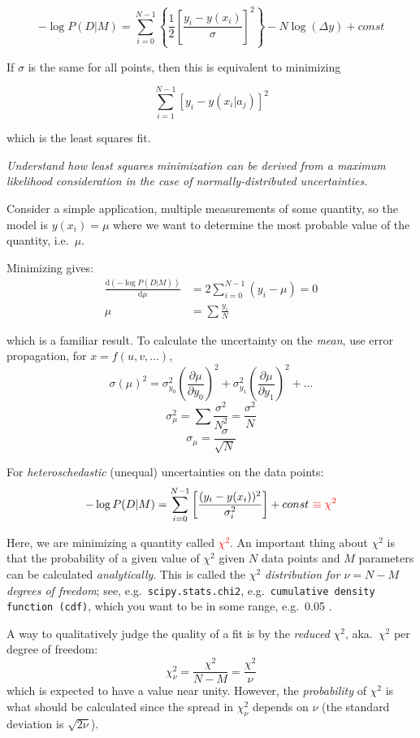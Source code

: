 \documentclass[12pt]{article}
\begin{document}
$$ -\log P(D|M) = \sum^{N-1}_{i=0}\left\{\frac{1}{2}\left[
\frac{y_i-y(x_i)}{\sigma}\right]^2\right\}
        -N\log(\Delta y) + const $$

If $\sigma$ is the same for all points, then this is equivalent to minimizing

    $$ \sum^{N-1}_{i=1}\left[y_i-y(x_i|a_j)\right]^2 $$

which is the least squares fit.

\colorbox{hl}{\parbox{0.9\textwidth}
{\emph{Understand how least squares minimization can be derived from a maximum
        likelihood consideration in the case of normally-distributed
        uncertainties.}}}

Consider a simple application, multiple measurements of some quantity, so the
model is $y(x_i) = \mu$ where we want to determine the most probable value of
the quantity, i.e.\ $\mu$.

Minimizing gives:
\begin{align*}
    \frac{\mathrm{d}(-\log P(D|M))}{\mathrm{d}\mu}
    &= 2\sum^{N-1}_{i=0}(y_i-\mu) = 0 \\
    \mu &= \sum \frac{y_i}{N}
\end{align*}

which is a familiar result. To calculate the uncertainty on the
\emph{mean}, use error propagation, for $x=f(u,v,\ldots)$,
    $$ \sigma(\mu)^2 = \sigma_{y_0}^2
    \left( \frac{\partial{\mu}}{\partial{y}_0}\right)^2
    + \sigma_{y_1}^2
    \left( \frac{\partial{\mu}}{\partial{y}_1}\right)^2
    + \ldots $$
    $$ \sigma_{\mu}^{2} = \sum\frac{\sigma^{2}}{N^{2}} = \frac{\sigma^{2}}{N}$$
    $$ \sigma_{\mu} = \frac{\sigma}{\sqrt{N}} $$

For \emph{heteroschedastic} (unequal) uncertainties on the data points:
$$ -\log P(D|M) = \sum_{i=0}^{N-1}\left[
\frac{(y_i-y(x_i))^{2}}{\sigma_{i}^{2}}\right] + const\
\textcolor{red}{\equiv \chi^2} $$

Here, we are minimizing a quantity called \textcolor{red}
{$\chi^2$}. An important thing about $\chi^2$ is that the probability
of a given value of $\chi^2$ given $N$ data points and $M$ parameters
can be calculated \emph{analytically}. This is called the
\emph{$\chi^2$ distribution for $\nu = N-M$ degrees of freedom};
see, e.g.\ \texttt{scipy.stats.chi2}, e.g.\ \texttt{cumulative
density function (cdf)}, which you want to be in some range, e.g.\
0.05 .

A way to qualitatively judge the quality of a fit is by the
\emph{reduced} $\chi^2$, aka.\ $\chi^2$ per degree of freedom:
    $$  \chi_{\nu}^2 = \frac{\chi^2}{N-M} = \frac{\chi^2}{\nu}    $$
which is expected to have a value near unity.
However, the \emph{probability} of $\chi^2$ is what should be calculated since the
spread in $\chi_{\nu}^2$ depends on $\nu$ (the standard deviation
is $\sqrt{2\nu}$).
\end{document}
